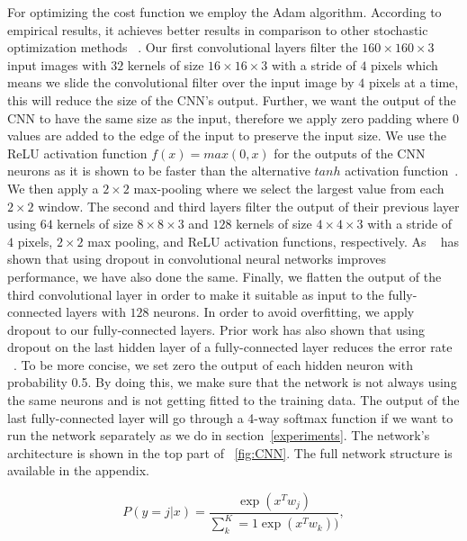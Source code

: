 \documentclass{article} %
\begin{document}
For optimizing the cost function we employ the Adam algorithm. According to empirical results, it achieves better results in comparison to other stochastic optimization methods ~\cite{adam}. Our first convolutional layers filter the $160\times160\times3$ input images with $32$ kernels of size $16\times16\times3$ with a stride of $4$ pixels which means we slide the convolutional filter over the input image by $4$ pixels at a time, this will reduce the size of the CNN's output. Further, we want the output of the CNN to have the same size as the input, therefore we apply zero padding where $0$ values are added to the edge of the input to preserve the input size. We use the ReLU activation function $f(x) = max(0,x)$ for the outputs of the CNN neurons as it is shown to be faster than the alternative $tanh$ activation function~\cite{imagehinton}. We then apply a $2\times2$ max-pooling where we select the largest value from each $2\times2$ window. 
The second and third layers filter the output of their previous layer using $64$ kernels of size $8\times8\times3$ and $128$ kernels of size $4\times4\times3$ with a stride of $4$ pixels, $2\times2$ max pooling, and ReLU activation functions, respectively. As ~\cite{CNNdropout2} has shown that using dropout in convolutional neural networks improves performance, we have also done the same.
Finally, we flatten the output of the third convolutional layer in order to make it suitable as input to the fully-connected layers with $128$ neurons. In order to avoid overfitting, we apply dropout to our fully-connected layers. Prior work has also shown that using dropout on the last hidden layer of a fully-connected layer reduces the error rate ~\cite{CNNdropout}. To be more concise, we set zero the output of each hidden neuron with probability 0.5. By doing this, we make sure that the network is not always using the same neurons and is not getting fitted to the training data. The output of the last fully-connected layer will go through a 4-way softmax function if we want to run the network separately as we do in section~\ref{experiments}. The network's architecture is shown in the top part of 
~\ref{fig:CNN}. The full network structure is available in the appendix.

\begin{equation}
  \label{softmax}
  P(y=j | x) = \frac{\exp(x^T w_j)}{\sum^{K}_k=1 \exp(x^T w_k))},
\end{equation}
\end{document}
